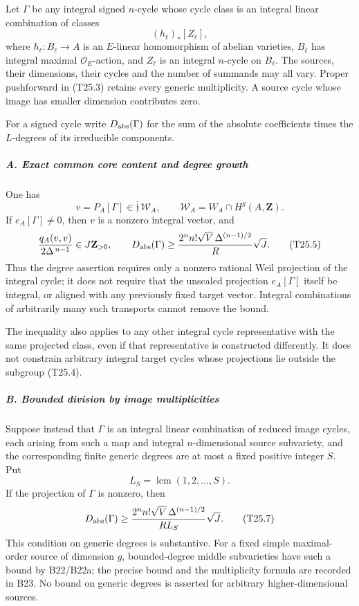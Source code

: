 \documentclass[11pt,a4paper]{article}
\theoremstyle{definition}
\begin{document}
Let \(\Gamma\) be any integral signed \(n\)-cycle whose cycle class is an integral linear combination of classes \[
 (h_\ell)_*[Z_\ell],
 \tag{T25.3}
\] where \(h_\ell:B_\ell\to A\) is an \(E\)-linear homomorphism of abelian varieties, \(B_\ell\) has integral maximal \(\mathcal O_E\)-action, and \(Z_\ell\) is an integral \(n\)-cycle on \(B_\ell\). The sources, their dimensions, their cycles and the number of summands may all vary. Proper pushforward in (T25.3) retains every generic multiplicity. A source cycle whose image has smaller dimension contributes zero.

For a signed cycle write \(D_{\rm abs}(\Gamma)\) for the sum of the absolute coefficients times the \(L\)-degrees of its irreducible components.

\subparagraph{A. Exact common core content and degree growth}\label{a.-exact-common-core-content-and-degree-growth}

One has \[
 v=P_A[\Gamma]\in\overline{\mathfrak j}\,\mathscr W_A,
 \qquad \mathscr W_A=W_A\cap H^g(A,\mathbf Z).
 \tag{T25.4}
\] If \(e_A[\Gamma]\ne0\), then \(v\) is a nonzero integral vector, and \[
 \frac{q_A(v,v)}{2\Delta^{\,n-1}}\in J\mathbf Z_{>0},
 \qquad
 D_{\rm abs}(\Gamma)
   \ge
    \frac{2^n n!\sqrt V\,\Delta^{(n-1)/2}}{R}\sqrt J.
 \tag{T25.5}
\] Thus the degree assertion requires only a nonzero rational Weil projection of the integral cycle; it does not require that the unscaled projection \(e_A[\Gamma]\) itself be integral, or aligned with any previously fixed target vector. Integral combinations of arbitrarily many such transports cannot remove the bound.

The inequality also applies to any other integral cycle representative with the same projected class, even if that representative is constructed differently. It does not constrain arbitrary integral target cycles whose projections lie outside the subgroup (T25.4).

\subparagraph{B. Bounded division by image multiplicities}\label{b.-bounded-division-by-image-multiplicities}

Suppose instead that \(\Gamma\) is an integral linear combination of reduced image cycles, each arising from such a map and integral \(n\)-dimensional source subvariety, and the corresponding finite generic degrees are at most a fixed positive integer \(S\). Put \[
 L_S=\operatorname{lcm}(1,2,\ldots,S).
 \tag{T25.6}
\] If the projection of \(\Gamma\) is nonzero, then \[
 D_{\rm abs}(\Gamma)
   \ge
    \frac{2^n n!\sqrt V\,\Delta^{(n-1)/2}}{R L_S}\sqrt J.
 \tag{T25.7}
\] This condition on generic degrees is substantive. For a fixed simple maximal-order source of dimension \(g\), bounded-degree middle subvarieties have such a bound by B22/B22a; the precise bound and the multiplicity formula are recorded in B23. No bound on generic degrees is asserted for arbitrary higher-dimensional sources.
\end{document}
